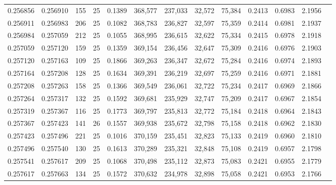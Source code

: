 \begin{tabular}{rrrrrrrrrrrrr}
0.256856 & 0.256910 &   155 &  25 &                                     0.1389 & 368,577 & 237,033 &  32,572 &  75,384 & 0.2413 & 0.6983 & 2.1956 \\
0.256911 & 0.256983 &   206 &  25 &                                     0.1082 & 368,783 & 236,827 &  32,597 &  75,359 & 0.2414 & 0.6981 & 2.1937 \\
0.256984 & 0.257059 &   212 &  25 &                                     0.1055 & 368,995 & 236,615 &  32,622 &  75,334 & 0.2415 & 0.6978 & 2.1918 \\
0.257059 & 0.257120 &   159 &  25 &                                     0.1359 & 369,154 & 236,456 &  32,647 &  75,309 & 0.2416 & 0.6976 & 2.1903 \\
0.257120 & 0.257163 &   109 &  25 &                                     0.1866 & 369,263 & 236,347 &  32,672 &  75,284 & 0.2416 & 0.6974 & 2.1893 \\
0.257164 & 0.257208 &   128 &  25 &                                     0.1634 & 369,391 & 236,219 &  32,697 &  75,259 & 0.2416 & 0.6971 & 2.1881 \\
0.257208 & 0.257263 &   158 &  25 &                                     0.1366 & 369,549 & 236,061 &  32,722 &  75,234 & 0.2417 & 0.6969 & 2.1866 \\
0.257264 & 0.257317 &   132 &  25 &                                     0.1592 & 369,681 & 235,929 &  32,747 &  75,209 & 0.2417 & 0.6967 & 2.1854 \\
0.257319 & 0.257367 &   116 &  25 &                                     0.1773 & 369,797 & 235,813 &  32,772 &  75,184 & 0.2418 & 0.6964 & 2.1843 \\
0.257367 & 0.257423 &   141 &  26 &                                     0.1557 & 369,938 & 235,672 &  32,798 &  75,158 & 0.2418 & 0.6962 & 2.1830 \\
0.257423 & 0.257496 &   221 &  25 &                                     0.1016 & 370,159 & 235,451 &  32,823 &  75,133 & 0.2419 & 0.6960 & 2.1810 \\
0.257496 & 0.257540 &   130 &  25 &                                     0.1613 & 370,289 & 235,321 &  32,848 &  75,108 & 0.2419 & 0.6957 & 2.1798 \\
0.257541 & 0.257617 &   209 &  25 &                                     0.1068 & 370,498 & 235,112 &  32,873 &  75,083 & 0.2421 & 0.6955 & 2.1779 \\
0.257617 & 0.257663 &   134 &  25 &                                     0.1572 & 370,632 & 234,978 &  32,898 &  75,058 & 0.2421 & 0.6953 & 2.1766 \\

\end{tabular}
